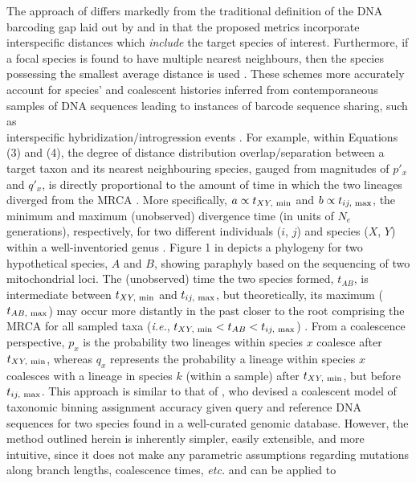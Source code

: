 \documentclass[12pt]{article}
\begin{document}
The approach of \citet{phillips2024measure} differs markedly from the traditional definition of the DNA barcoding gap laid out by \citet{meyer2005dna} and \citet{meier2008use} in that the proposed metrics incorporate interspecific distances which \textit{include} the target species of interest. Furthermore, if a focal species is found to have multiple nearest neighbours, then the species possessing the smallest average distance is used \citep{phillips2024measure}. These schemes more accurately account for species' and coalescent histories inferred from contemporaneous samples of DNA sequences leading to instances of barcode sequence sharing, such as \\ interspecific hybridization/introgression events \citep{phillips2024measure}. For example, within Equations (3) and (4), the degree of distance distribution overlap/separation between a target taxon and its nearest neighbouring species, gauged from magnitudes of $p'_x$ and $q'_x$, is directly proportional to the amount of time in which the two lineages diverged from the MRCA \citep{phillips2024measure}. More specifically, $a \propto t_{XY, \hspace{1mm} \mathrm{min}}$ and $b \propto t_{ij, \hspace{1mm} \mathrm{max}}$, the minimum and maximum (unobserved) divergence time (in units of $N_e$ generations), respectively, for two different individuals ($i$, $j$) and species ($X$, $Y$) within a well-inventoried genus \citep{phillips2024measure}. Figure 1 in \citet{phillips2024measure} depicts a phylogeny for two hypothetical species, $A$ and $B$, showing paraphyly based on the sequencing of two mitochondrial loci. The (unobserved) time the two species formed, $t_{AB}$, is intermediate between $t_{XY, \hspace{1mm} \mathrm{min}}$ and $t_{ij, \hspace{1mm} \mathrm{max}}$, but theoretically, its maximum ($t_{AB, \hspace{1mm} \mathrm{max}}$) may occur more distantly in the past closer to the root comprising the MRCA for all sampled taxa (\textit{i.e.}, $t_{XY, \hspace{1mm} \mathrm{min}} < t_{AB} < t_{ij, \hspace{1mm} \mathrm{max}}$) \citep{phillips2024measure}. From a coalescence perspective, $p_x$ is the probability two lineages within species $x$ coalesce after $t_{XY, \hspace{1mm} \mathrm{min}}$, whereas $q_x$ represents the probability a lineage within species $x$ coalesces with a lineage in species $k$ (within a sample) after $t_{XY, \hspace{1mm} \mathrm{min}}$, but before $t_{ij, \hspace{1mm} \mathrm{max}}$. This approach is similar to that of \citet{desanctis2022theoretical}, who devised a coalescent model of taxonomic binning assignment accuracy given query and reference DNA sequences for two species found in a well-curated genomic database. However, the method outlined herein is inherently simpler, easily extensible, and more intuitive, since it does not make any parametric assumptions regarding mutations along branch lengths, coalescence times, \textit{etc.} and can be applied to 
\end{document}
